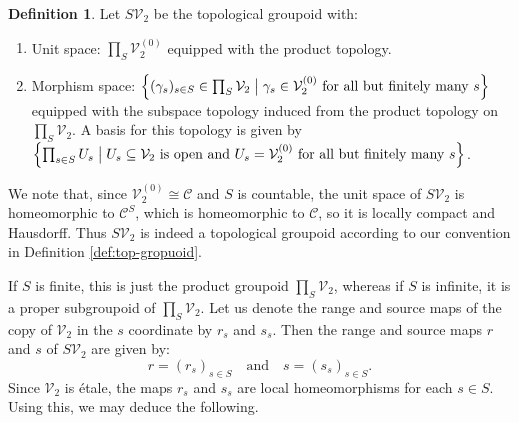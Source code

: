 \documentclass[10pt,a4paper]{amsart}
\numberwithin{equation}{section}
\numberwithin{figure}{section}
\theoremstyle{definition}
\newtheorem{defn}[thm]{Definition}
\newcommand{\cC}{\mathcal{C}}
\newcommand{\cV}{\mathcal{V}}
\begin{document}
\begin{defn}
\label{defn:groupoid-svg}
Let $S\mathcal{V}_2$ be the topological groupoid with:
\begin{enumerate}
\item Unit space: $\prod_S \mathcal{V}_2^{(0)}$ equipped with the product topology.
\item Morphism space: $\left\lbrace (\gamma_s)_{s\in S} \in \prod_S \mathcal{V}_2 \bigm| \gamma_s \in \mathcal{V}^{(0)}_2 \text{ for all but finitely many } s \right\rbrace$ equipped with the subspace topology induced from the product topology on $\prod_S \cV_2$. A basis for this topology is given by $\left\lbrace \prod_{s \in S} U_s \bigm| U_s \subseteq \cV_2 \text{ is open and } U_s = \mathcal{V}^{(0)}_2 \text{ for all but finitely many } s \right\rbrace$.
\end{enumerate}
We note that, since $\cV_2^{(0)} \cong \cC$ and $S$ is countable, the unit space of $S\cV_2$ is homeomorphic to $\cC^S$, which is homeomorphic to $\cC$, so it is locally compact and Hausdorff. Thus $S\cV_2$ is indeed a topological groupoid according to our convention in Definition \ref{def:top-gropuoid}.
\end{defn}

If $S$ is finite, this is just the product groupoid $\prod_S \cV_2$, whereas if $S$ is infinite, it is a proper subgroupoid of $\prod_S \cV_2$. Let us denote the range and source maps of the copy of $\cV_2$ in the $s$ coordinate by $r_s$ and $s_s$. Then the range and source maps $r$ and $s$ of $S\cV_2$ are given by:
\[
r = (r_s)_{s\in S} \quad\text{and}\quad s = (s_s)_{s\in S}.
\]
Since $\cV_2$ is étale, the maps $r_s$ and $s_s$ are local homeomorphisms for each $s \in S$. Using this, we may deduce the following.
\end{document}

